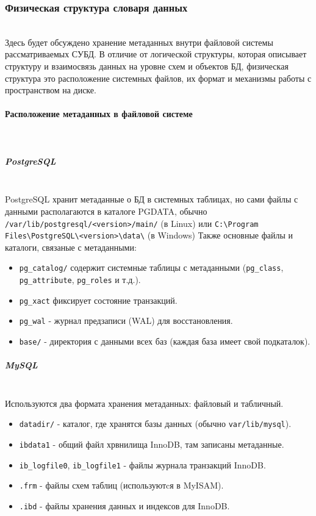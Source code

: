 \subsubsection{Физическая структура словаря данных} ~\\

Здесь будет обсуждено хранение метаданных внутри файловой системы рассматриваемых СУБД. В отличие от логической структуры, которая описывает структуру и взаимосвязь данных на уровне схем и объектов БД, физическая структура это расположение системных файлов, их формат и механизмы работы с пространством на диске.

\paragraph{Расположение метаданных в файловой системе} ~\\

\subparagraph{PostgreSQL} \autocite{PostgreSQLdocc65} ~\\

PostgreSQL хранит метаданные о БД в системных таблицах, но сами файлы с данными располагаются в каталоге PGDATA, обычно \texttt{/var/lib/postgresql/<version>/main/} (в Linux) или \texttt{C:\textbackslash{}Program Files\textbackslash{}PostgreSQL\textbackslash{}<version>\textbackslash{}data\textbackslash{}} (в Windows)
Также основные файлы и каталоги, связаные с метаданными:
\begin{itemize}
    \item \texttt{pg\_catalog/} содержит системные таблицы с метаданными (\texttt{pg\_class}, \texttt{pg\_attribute}, \texttt{pg\_roles} и т.д.).
    \item \texttt{pg\_xact} фиксирует состояние транзакций.
    \item \texttt{pg\_wal} - журнал предзаписи (WAL) для восстановления.
    \item \texttt{base/} - директория с данными всех баз (каждая база имеет свой подкаталок).
\end{itemize}

\subparagraph{MySQL} \autocite[§17.6]{Mysqldoc4} ~\\

Используются два формата хранения метаданных: файловый и табличный.

\begin{itemize}
    \item \texttt{datadir/} - каталог, где хранятся базы данных (обычно \texttt{var/lib/mysql}).
    \item \texttt{ibdata1} - общий файл хрвнилища InnoDB, там записаны метаданные.
    \item \texttt{ib\_logfile0}, \texttt{ib\_logfile1} - файлы журнала транзакций InnoDB.
    \item \texttt{.frm} - файлы схем таблиц (используютcя в MyISAM).
    \item \texttt{.ibd} - файлы хранения данных и индексов для InnoDB. 
\end{itemize}

